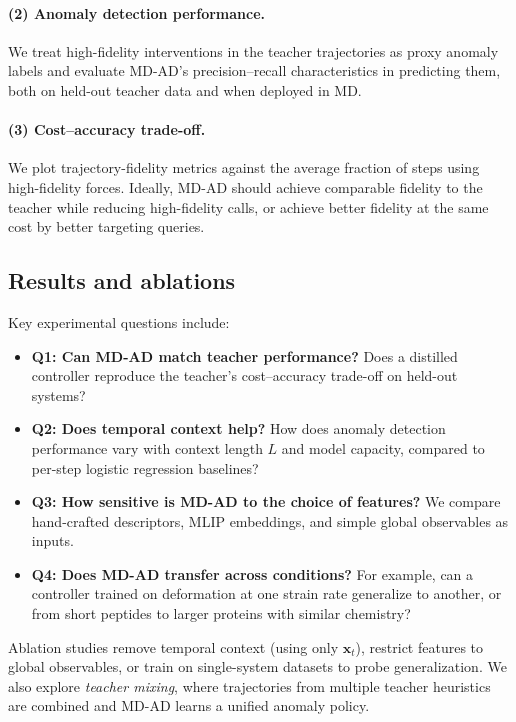 \documentclass{article}
\begin{document}
\paragraph{(2) Anomaly detection performance.}
We treat high-fidelity interventions in the teacher trajectories as proxy anomaly labels and evaluate MD-AD's precision--recall characteristics in predicting them, both on held-out teacher data and when deployed in MD.

\paragraph{(3) Cost--accuracy trade-off.}
We plot trajectory-fidelity metrics against the average fraction of steps using high-fidelity forces. Ideally, MD-AD should achieve comparable fidelity to the teacher while reducing high-fidelity calls, or achieve better fidelity at the same cost by better targeting queries.

\subsection{Results and ablations}

Key experimental questions include:
\begin{itemize}
    \item \textbf{Q1: Can MD-AD match teacher performance?} Does a distilled controller reproduce the teacher's cost--accuracy trade-off on held-out systems?
    \item \textbf{Q2: Does temporal context help?} How does anomaly detection performance vary with context length $L$ and model capacity, compared to per-step logistic regression baselines?
    \item \textbf{Q3: How sensitive is MD-AD to the choice of features?} We compare hand-crafted descriptors, MLIP embeddings, and simple global observables as inputs.
    \item \textbf{Q4: Does MD-AD transfer across conditions?} For example, can a controller trained on deformation at one strain rate generalize to another, or from short peptides to larger proteins with similar chemistry?
\end{itemize}

Ablation studies remove temporal context (using only $\mathbf{x}_t$), restrict features to global observables, or train on single-system datasets to probe generalization. We also explore \emph{teacher mixing}, where trajectories from multiple teacher heuristics are combined and MD-AD learns a unified anomaly policy.
\end{document}
